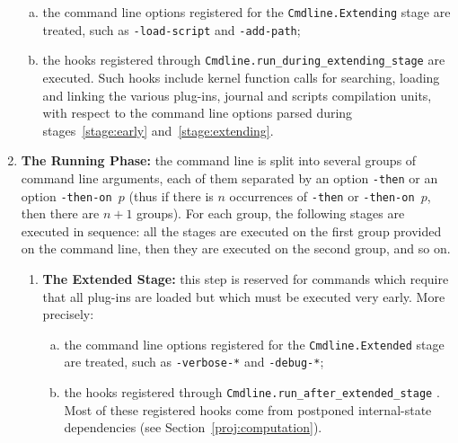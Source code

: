 \begin{enumerate}[A --]
  \begin{enumerate}[(a)]
  \item the command line options registered for the
    \texttt{Cmdline.Extending} stage
    are treated, such as \texttt{-load-script} and
    \texttt{-add-path};

  \item the hooks registered through
    \texttt{Cmdline.run\_during\_extending\_stage}
     are executed. Such
    hooks include kernel function calls for searching, loading and linking the
    various plug-ins, journal and scripts compilation units, with respect to
    the command line options parsed during stages~\ref{stage:early}
    and~\ref{stage:extending}.
  \end{enumerate}

\item \textbf{The Running Phase:} the command line is split into several
  groups of command line arguments, each of them separated by an option
  \texttt{-then} or an option \texttt{-then-on $p$} (thus if there is $n$
  occurrences of \texttt{-then} or \texttt{-then-on $p$}, then there are $n+1$
  groups). For each group, the following stages are executed in sequence: all
  the stages are executed on the first group provided on the command line, then
  they are executed on the second group, and so on.

\begin{enumerate}[1.]

\item \textbf{The Extended Stage:} this step is reserved for commands which
  require that all plug-ins are loaded but which must be executed very
  early. More precisely:

  \begin{enumerate}[(a)]
  \item the command line options registered for the
    \texttt{Cmdline.Extended} stage
    are treated, such as \texttt{-verbose-*} and \texttt{-debug-*};

  \item the hooks registered through
    \texttt{Cmdline.run\_after\_extended\_stage}%
    .
    Most of these registered hooks come from postponed internal-state
    dependencies (see
    Section~\ref{proj:computation}).
  \end{enumerate}


\end{enumerate}
\end{enumerate}
